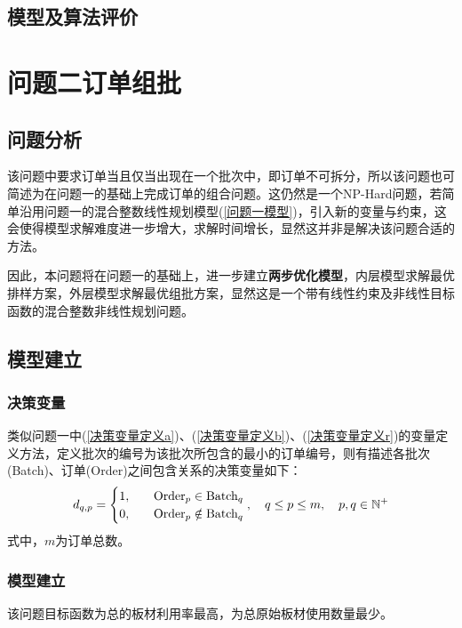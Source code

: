 \documentclass[bwprint]{gmcmthesis}
\begin{document}
\subsection{模型及算法评价}






\section{问题二订单组批}

\subsection{问题分析}
该问题中要求订单当且仅当出现在一个批次中，即订单不可拆分，所以该问题也可简述为在问题一的基础上完成订单的组合问题。这仍然是一个NP-Hard问题，若简单沿用问题一的混合整数线性规划模型(\ref{问题一模型})，引入新的变量与约束，这会使得模型求解难度进一步增大，求解时间增长，显然这并非是解决该问题合适的方法。

因此，本问题将在问题一的基础上，进一步建立\textbf{两步优化模型}，内层模型求解最优排样方案，外层模型求解最优组批方案，显然这是一个带有线性约束及非线性目标函数的混合整数非线性规划问题。

\subsection{模型建立}


\subsubsection{决策变量}

类似问题一中(\ref{决策变量定义a})、(\ref{决策变量定义b})、(\ref{决策变量定义r})的变量定义方法，定义批次的编号为该批次所包含的最小的订单编号，则有描述各批次(Batch)、订单(Order)之间包含关系的决策变量如下：
\begin{equation}   %
    d_{q,p}=
    \begin{cases}
        1, \quad  & \text{Order}_p \in  \text{Batch}_q \\
        0,\quad  & \text{Order}_p \notin  \text{Batch}_q \\
    \end{cases},\quad q\le p \le m,\quad p,q \in  \mathbb{N}^+\\
\end{equation}
\noindent 式中，$m$为订单总数。


\subsubsection{模型建立}
该问题目标函数为总的板材利用率最高，为总原始板材使用数量最少。
\end{document}
